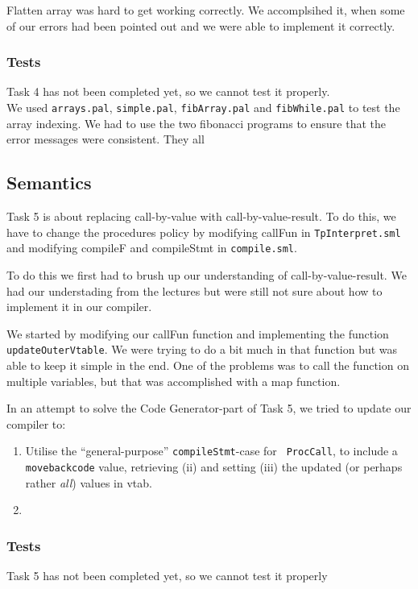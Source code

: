 \documentclass[11pt]{article}
\begin{document}
Flatten array was hard to get working correctly. We accomplsihed it, when some of our errors had been pointed out and we were able to implement it correctly.

\subsubsection*{Tests}%
Task 4 has not been completed yet, so we cannot test it properly.
\\

We used {\tt arrays.pal}, {\tt simple.pal}, {\tt fibArray.pal} and {\tt fibWhile.pal} to test the array indexing. We had to use the two fibonacci programs to ensure that the error messages were consistent. They all 

\subsection*{Semantics}
Task 5 is about replacing call-by-value with call-by-value-result. To do this, we have to change the procedures policy by modifying callFun in {\tt TpInterpret.sml} and modifying compileF and compileStmt in {\tt compile.sml}.

To do this we first had to brush up our understanding of call-by-value-result. We had our understading from the lectures but were still not sure about how to implement it in our compiler.

We started by modifying our callFun function and implementing the function {\tt updateOuterVtable}. We were trying to do a bit much in that function but was able to keep it simple in the end. One of the problems was to call the function on multiple variables, but that was accomplished with a map function.

In an attempt to solve the Code Generator-part of Task 5, we tried to update our compiler to:
\begin{enumerate}[i]
    \item Utilise the ``general-purpose'' {\tt compileStmt}-case for {\tt
        ProcCall}, to include a {\tt movebackcode} value, retrieving (ii) and
        setting (iii) the updated (or perhaps rather {\it all}) values in vtab.
    \item 
\end{enumerate}
        

\subsubsection*{Tests}
Task 5 has not been completed yet, so we cannot test it properly 
\end{document}
